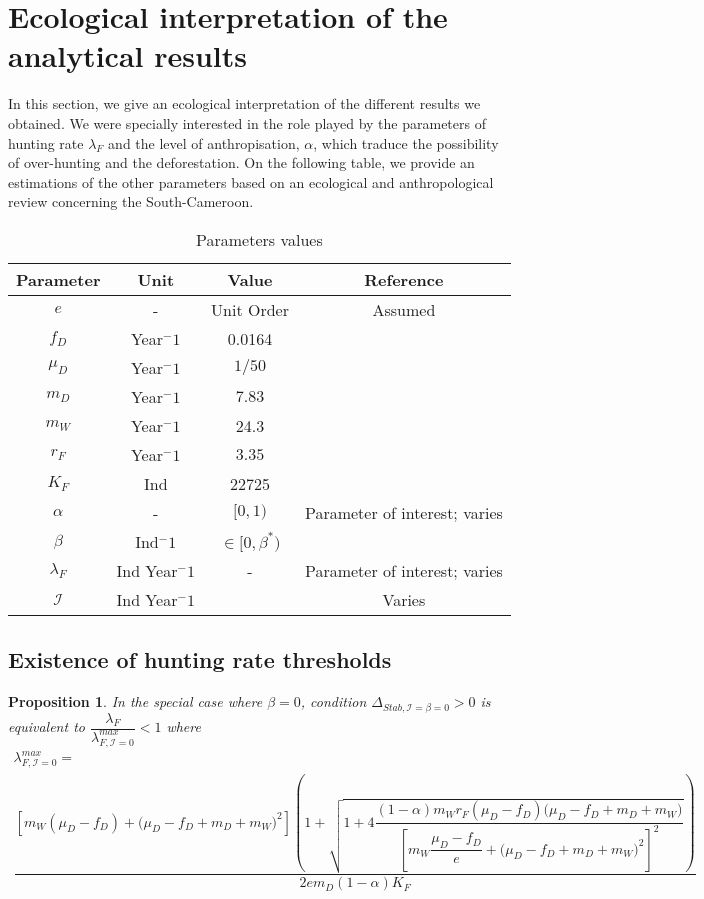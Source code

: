 \documentclass{article}
\newcommand{\lfw}{\lambda_{F}}
\newcommand{\lfw}{\lambda_{F}}
\newcommand{\cI}{\mathcal{I}}
\newtheorem{prop}{Proposition}
\begin{document}
\section{Ecological interpretation of the analytical results}
In this section, we give an ecological interpretation of the different results we obtained.  We were specially interested in the role played by the parameters of hunting rate $\lfw$ and the level of anthropisation, $\alpha$, which traduce the possibility of over-hunting and the deforestation. On the following table, we provide an estimations of the other parameters based on an ecological and anthropological review concerning the South-Cameroon.


\begin{table}[ht]
\centering
\begin{tabular}{|c|c|c|c|}
\hline 
Parameter & Unit & Value & Reference \\ 
\hline 
$e$ & - & Unit Order & Assumed\\
$f_D$ & Year$^-1$ &0.0164 & \cite{koppert_consommation_1996}\\
$\mu_D$ & Year$^-1$  & $1/50$ & \cite{ins_demographie}\\
$m_D$ & Year$^-1$  &$7.83$ & \cite{avila_interpreting_2019}\\
$m_W$ &Year$^-1$  &24.3 & \cite{avila_interpreting_2019}\\
$r_F$ & Year$^-1$ & $3.35$ & \cite{robinson_intrinsic_1986}\\
$K_F$ & Ind& 22725 & \cite{janson_ecological_1990} \\
$\alpha$ &-&  $[0, 1)$ & Parameter of interest; varies \\
$\beta$ & Ind$^-1$ & $\in [0, \beta^*)$ &  \\
$\lfw$ & Ind Year$^-1$ & - & Parameter of interest; varies \\
$\mathcal{I}$ &  Ind Year$^-1$ & & Varies \\
\hline
\end{tabular}
\caption{Parameters values}
\end{table}


\subsection{Existence of hunting rate thresholds}
\begin{prop}\label{prop:stab, cI = beta = 0}
In the special case where $\beta = 0$, condition $\Delta_{Stab, \cI =\beta =0} > 0$ is equivalent to $\dfrac{\lfw}{\lambda_{F, \cI = 0}^{max}} < 1$ where
\begin{multline*}
\lambda_{F, \cI = 0}^{max} = \\
 \dfrac{\left[m_{W}(\mu_{D}-f_{D})+\big(\mu_{D}-f_{D}+m_{D}+m_{W})^{2}\right]\left(1+\sqrt{1+4\dfrac{(1-\alpha)m_{W}r_{F}\left(\mu_{D}-f_{D}\right)\big(\mu_{D}-f_{D}+m_{D}+m_{W})}{\left[m_{W}\dfrac{\mu_{D}-f_{D}}{e}+\big(\mu_{D}-f_{D}+m_{D}+m_{W})^{2}\right]^{2}}}\right)}{2em_D (1-\alpha) K_F }
\end{multline*}
\end{prop}
\end{document}

